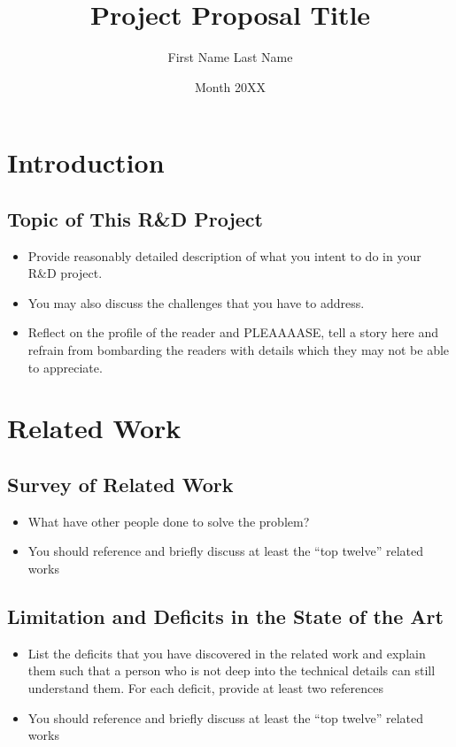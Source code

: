 \documentclass[rnd]{mas_proposal}
\title{Project Proposal Title}
\author{First Name Last Name}
\date{Month 20XX}
\begin{document}
\maketitle

\pagestyle{plain}

\section{Introduction}

\subsection{Topic of This R\&D Project}
\begin{itemize}
    \item Provide reasonably detailed description of what you intent to do in your R\&D project.
    \item You may also discuss the challenges that you have to address.
    \item Reflect on the profile of the reader and PLEAAAASE, tell a story here and refrain from bombarding the readers with details which they may not be able to appreciate.
\end{itemize}

\section{Related Work}

\subsection{Survey of Related Work}
\begin{itemize}
    \item What have other people done to solve the problem?
    \item You should reference and briefly discuss at least the ``top twelve'' related works
\end{itemize}

\subsection{Limitation and Deficits in the State of the Art}
\begin{itemize}
    \item List the deficits that you have discovered in the related work and explain them such that a person who is not deep into the technical details can still understand them.
    For each deficit, provide at least two references
    \item You should reference and briefly discuss at least the ``top twelve'' related works
\end{itemize}
\end{document}
